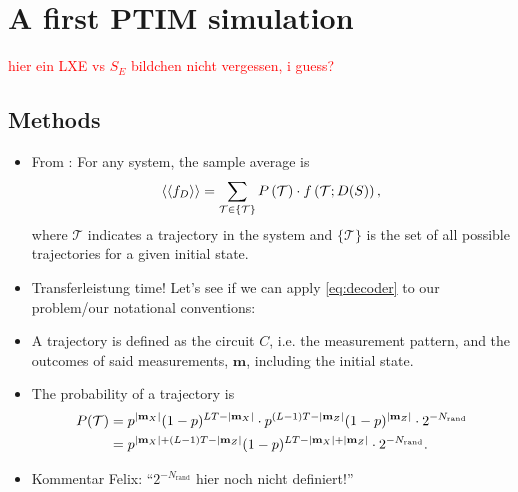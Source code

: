 \section{A first PTIM simulation}
\textcolor{red}{hier ein LXE vs $S_E$ bildchen nicht vergessen, i guess?}

\subsection{Methods}
\begin{itemize}
  \item From \cite{roserDecodingProjectiveTransverse2023}:
    For any system, the sample average is
    \begin{align}\label{eq:decoder}
      \expval{\expval{f_D}} = \sum_{\mathcal{T} \in \{
    \mathcal{T} \} } P\left(\mathcal{T}\right) \cdot
    f\left(\mathcal{T} ; D(S)\right)
    ,\end{align}
  where $\mathcal{T}$ indicates a trajectory in the system and
  $\{ \mathcal{T} \}$ is the set of all possible trajectories for a given
  initial state.
  \item Transferleistung time! Let's see if we can apply \cref{eq:decoder} to our
    problem/our notational conventions:
  \item A trajectory is defined as the circuit $C$, i.e. the measurement pattern,
    and the outcomes of said measurements, $\mathbf{m}$, including the initial
    state. 
  \item The probability of a trajectory is
    \begin{align}
      P(\mathcal{T}) &=
      p^{\abs{\mathbf{m}_X}}(1-p)^{LT-\abs{\mathbf{m}_X}}\cdot
      p^{(L-1)T-\abs{\mathbf{m}_Z}}(1-p)^{\abs{\mathbf{m}_Z}}\cdot
      2^{-N_\mathrm{rand}} \nonumber\\ &= 
      p^{\abs{\mathbf{m}_X}+(L-1)T-\abs{\mathbf{m}_Z}}(1-p)^{LT-\abs{\mathbf{m}_X}+\abs{\mathbf{m}_Z}}\cdot2^{-N_\mathrm{rand}}
    .\end{align}
  \item \textcolor{kw-olive}{Kommentar Felix: \enquote{$2^{-N_\mathrm{rand}}$ hier noch
    nicht definiert!}}
  

\end{itemize}
